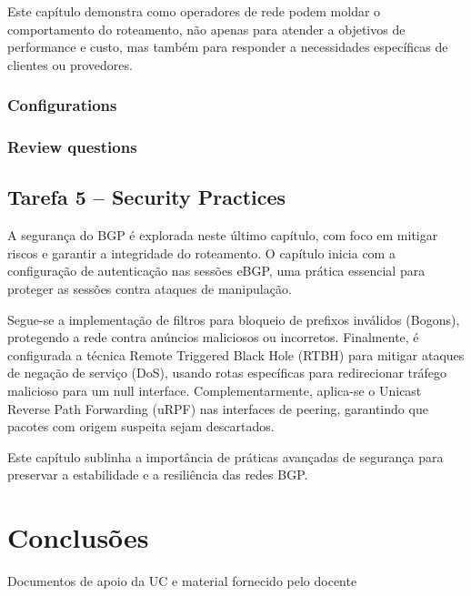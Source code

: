 \documentclass[11pt,english, openright, oneside]{book}
\begin{document}
Este capítulo demonstra como operadores de rede podem moldar o comportamento do roteamento, não apenas para atender a objetivos de performance e custo, mas também para responder a necessidades específicas de clientes ou provedores.

\subsection{Configurations}
\vspace{0.2cm}

\subsection{Review questions}
\vspace{0.2cm}


\section{Tarefa 5 -- Security Practices}
\vspace{0.2cm}

A segurança do BGP é explorada neste último capítulo, com foco em mitigar riscos e garantir a integridade do roteamento. O capítulo inicia com a configuração de autenticação nas sessões eBGP, uma prática essencial para proteger as sessões contra ataques de manipulação. 

Segue-se a implementação de filtros para bloqueio de prefixos inválidos (Bogons), protegendo a rede contra anúncios maliciosos ou incorretos. Finalmente, é configurada a técnica Remote Triggered Black Hole (RTBH) para mitigar ataques de negação de serviço (DoS), usando rotas específicas para redirecionar tráfego malicioso para um null interface. Complementarmente, aplica-se o Unicast Reverse Path Forwarding (uRPF) nas interfaces de peering, garantindo que pacotes com origem suspeita sejam descartados. 

Este capítulo sublinha a importância de práticas avançadas de segurança para preservar a estabilidade e a resiliência das redes BGP.


\chapter{Conclusões}
\vspace{0.2cm}


\pagebreak

\begin{thebibliography}{4} %
   Documentos de apoio da UC e material fornecido pelo docente
\end{thebibliography}

\mainmatter
\end{document}
